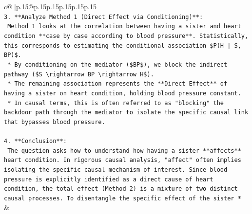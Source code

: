 \documentclass{article}
\begin{document}
{\begin{supertabular}{c@{$\;$}|p{.15\linewidth}@{}p{.15\linewidth}p{.15\linewidth}p{.15\linewidth}p{.15\linewidth}p{.15\linewidth}}
{{{\\ 
\texttt{3.  **Analyze Method 1 (Direct Effect via Conditioning)**:} \\
\texttt{    Method 1 looks at the correlation between having a sister and heart condition **case by case according to blood pressure**. Statistically, this corresponds to estimating the conditional association \$P(H | S, BP)\$.} \\
\texttt{    *   By conditioning on the mediator (\$BP\$), we block the indirect pathway (\$S \textbackslash{}rightarrow BP \textbackslash{}rightarrow H\$).} \\
\texttt{    *   The remaining association represents the **Direct Effect** of having a sister on heart condition, holding blood pressure constant.} \\
\texttt{    *   In causal terms, this is often referred to as "blocking" the backdoor path through the mediator to isolate the specific causal link that bypasses blood pressure.} \\
\\ 
\texttt{4.  **Conclusion**:} \\
\texttt{    The question asks how to understand how having a sister **affects** heart condition. In rigorous causal analysis, "affect" often implies isolating the specific causal mechanism of interest. Since blood pressure is explicitly identified as a direct cause of heart condition, the total effect (Method 2) is a mixture of two distinct causal processes. To disentangle the specific effect of the sister *} \\
            }
        }
    }
    & \\ \\


\end{supertabular}}
\end{document}

